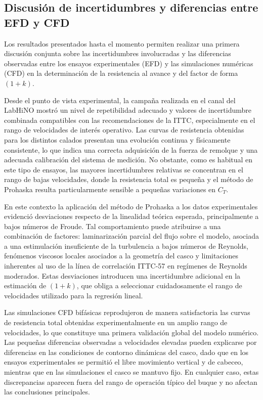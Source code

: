 \subsection{Discusión de incertidumbres y diferencias entre EFD y CFD}

Los resultados presentados hasta el momento permiten realizar una primera discusión conjunta sobre las incertidumbres involucradas y las diferencias observadas entre los ensayos experimentales (EFD) y las simulaciones numéricas (CFD) en la determinación de la resistencia al avance y del factor de forma $(1+k)$.

Desde el punto de vista experimental, la campaña realizada en el canal del LabHiNO mostró un nivel de repetibilidad adecuado y valores de incertidumbre combinada compatibles con las recomendaciones de la ITTC, especialmente en el rango de velocidades de interés operativo. Las curvas de resistencia obtenidas para los distintos calados presentan una evolución continua y físicamente consistente, lo que indica una correcta adquisición de la fuerza de remolque y una adecuada calibración del sistema de medición. No obstante, como es habitual en este tipo de ensayos, las mayores incertidumbres relativas se concentran en el rango de bajas velocidades, donde la resistencia total es pequeña y el método de Prohaska resulta particularmente sensible a pequeñas variaciones en $C_T$.

En este contexto la aplicación del método de Prohaska a los datos experimentales evidenció desviaciones respecto de la linealidad teórica esperada, principalmente a bajos números de Froude. Tal comportamiento puede atribuirse a una combinación de factores: laminarización parcial del flujo sobre el modelo, asociada a una estimulación insuficiente de la turbulencia a bajos números de Reynolds, fenómenos viscosos locales asociados a la geometría del casco y limitaciones inherentes al uso de la línea de correlación ITTC-57 en regímenes de Reynolds moderados. Estas desviaciones introducen una incertidumbre adicional en la estimación de $(1+k)$, que obliga a seleccionar cuidadosamente el rango de velocidades utilizado para la regresión lineal.

Las simulaciones CFD bifásicas reprodujeron de manera satisfactoria las curvas de resistencia total obtenidas experimentalmente en un amplio rango de velocidades, lo que constituye una primera validación global del modelo numérico. Las pequeñas diferencias observadas a velocidades elevadas pueden explicarse por diferencias en las condiciones de contorno dinámicas del casco, dado que en los ensayos experimentales se permitió el libre movimiento vertical y de cabeceo, mientras que en las simulaciones el casco se mantuvo fijo. En cualquier caso, estas discrepancias aparecen fuera del rango de operación típico del buque y no afectan las conclusiones principales.

